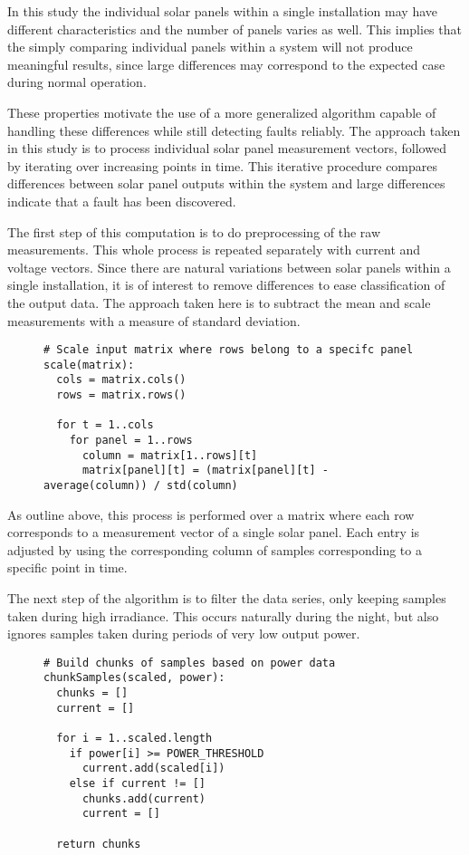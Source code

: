 In this study the individual solar panels within a single installation may have different characteristics and the number of panels varies as well.
This implies that the simply comparing individual panels within a system will not produce meaningful results, since large differences may correspond to the expected case during normal operation.

These properties motivate the use of a more generalized algorithm capable of handling these differences while still detecting faults reliably.
The approach taken in this study is to process individual solar panel measurement vectors, followed by iterating over increasing points in time.
This iterative procedure compares differences between solar panel outputs within the system and large differences indicate that a fault has been discovered.

The first step of this computation is to do preprocessing of the raw measurements.
This whole process is repeated separately with current and voltage vectors.
Since there are natural variations between solar panels within a single installation, it is of interest to remove differences to ease classification of the output data.
The approach taken here is to subtract the mean and scale measurements with a measure of standard deviation.

\begin{figure}[H]
\begin{verbatim}
# Scale input matrix where rows belong to a specifc panel
scale(matrix):
  cols = matrix.cols()
  rows = matrix.rows()

  for t = 1..cols
    for panel = 1..rows
      column = matrix[1..rows][t]
      matrix[panel][t] = (matrix[panel][t] - average(column)) / std(column)
\end{verbatim}
\end{figure}

As outline above, this process is performed over a matrix where each row corresponds to a measurement vector of a single solar panel.
Each entry is adjusted by using the corresponding column of samples corresponding to a specific point in time.

The next step of the algorithm is to filter the data series, only keeping samples taken during high irradiance.
This occurs naturally during the night, but also ignores samples taken during periods of very low output power.

\begin{figure}[H]
\begin{verbatim}
# Build chunks of samples based on power data
chunkSamples(scaled, power):
  chunks = []
  current = []

  for i = 1..scaled.length
    if power[i] >= POWER_THRESHOLD
      current.add(scaled[i])
    else if current != []
      chunks.add(current)
      current = []

  return chunks
\end{verbatim}
\end{figure}

